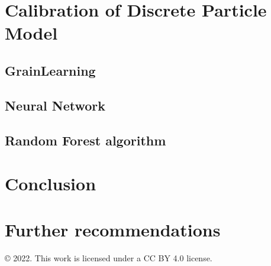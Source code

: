 \documentclass{article}
\begin{document}


\section{Calibration of Discrete Particle Model}\label{section:Calibration}
    
\subsection{GrainLearning}\label{section:GLtheory}



\subsection{Neural Network}


\subsection{Random Forest algorithm}








\section{Conclusion} 

\section{Further recommendations}
\pagebreak 





\begin{center}
© 2022. This work is licensed under a CC BY 4.0 license. 
\end{center}
\end{document}
